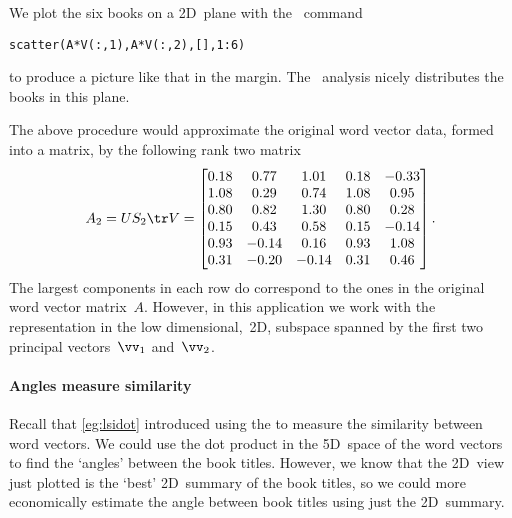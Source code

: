 \begin{enumerate}
{}
We plot the six books on a 2D~plane with the \script\ command
\begin{verbatim}
scatter(A*V(:,1),A*V(:,2),[],1:6)
\end{verbatim}
to produce a picture like that in the margin.
The \svd\ analysis nicely distributes the books in this plane.
\end{enumerate}

The above procedure would approximate the original word vector data, formed into a matrix, by the following rank two matrix \twodp
\begin{equation*}
A_2=US_2\tr V
=\begin{bmatrix} 0.18&0.77&1.01&0.18&-0.33
\\1.08&0.29&0.74&1.08&0.95
\\0.80&0.82&1.30&0.80&0.28
\\0.15&0.43&0.58&0.15&-0.14
\\0.93&-0.14&0.16&0.93&1.08
\\0.31&-0.20&-0.14&0.31&0.46 \end{bmatrix}.
\end{equation*}
The largest components in each row do correspond to the ones in the original word vector matrix~\(A\).
However, in this application we work with the representation in the low dimensional,~2D, subspace spanned by the first two principal vectors~\(\vv_1\) and~\(\vv_2\).


\paragraph{Angles measure similarity}
Recall that \autoref{eg:lsidot} introduced using the  to measure the similarity between word vectors.
We could use the dot product in the 5D~space of the word vectors to find the `angles' between the book titles.
However, we know that the 2D~view just plotted is the `best' 2D~summary of the book titles, so we could more economically estimate the angle between book titles using just the 2D~summary.

